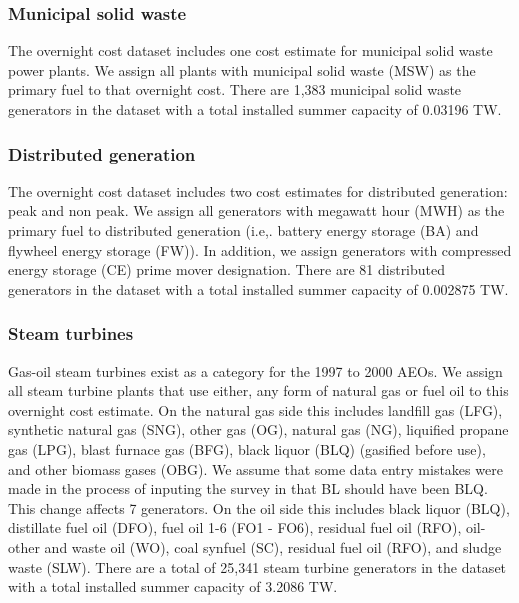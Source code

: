 \documentclass[10pt]{report}
\begin{document}
\subsubsection{Municipal solid waste}
The overnight cost dataset includes one cost estimate for municipal solid waste power plants.
We assign all plants with municipal solid waste (MSW) as the primary fuel to that overnight cost. 
There are 1,383 municipal solid waste generators in the dataset with a total installed summer capacity of  0.03196 TW. 

\subsubsection{Distributed generation}
The overnight cost dataset includes two cost estimates for distributed generation: peak and non peak.
We assign all generators with megawatt hour (MWH) as the primary fuel to distributed generation (i.e,. battery energy storage (BA) and flywheel energy storage (FW)). 
In addition, we assign generators with compressed energy storage (CE) prime mover designation.
There are 81 distributed generators in the dataset with a total installed summer capacity of 0.002875 TW. 

\subsubsection{Steam turbines}
Gas-oil steam turbines exist as a category for the 1997 to 2000 AEOs. 
We assign all steam turbine plants that use either, any form of natural gas or fuel oil to this overnight cost estimate. 
On the natural gas side this includes landfill gas (LFG), synthetic natural gas (SNG), other gas (OG), natural gas (NG), liquified propane gas (LPG), blast furnace gas (BFG), black liquor (BLQ) (gasified before use), and other biomass gases (OBG). 
We assume that some data entry mistakes were made in the process of inputing the survey in that BL should have been BLQ.
This change affects 7 generators.  
On the oil side this includes black liquor (BLQ), distillate fuel oil (DFO), fuel oil 1-6 (FO1 - FO6), residual fuel oil (RFO), oil-other and waste oil (WO), coal synfuel (SC), residual fuel oil (RFO), and sludge waste (SLW).
There are a total of 25,341 steam turbine generators in the dataset with a total installed summer capacity of 3.2086 TW.  
\end{document}
